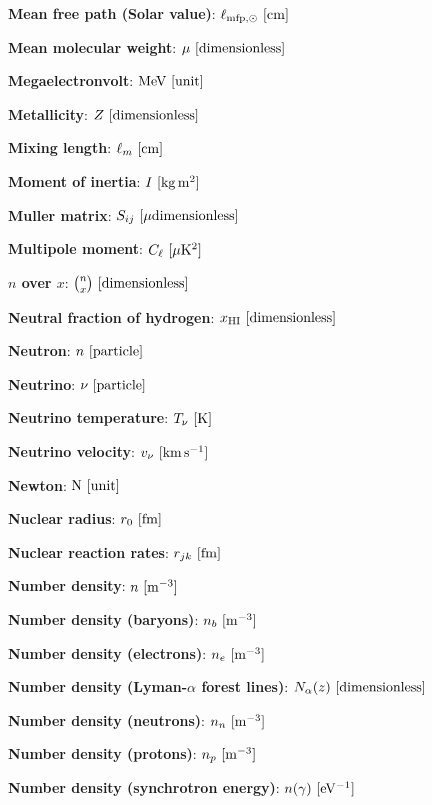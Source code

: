 \documentclass[a4paper,10pt]{article}
\begin{document}
{\noindent}\textbf{Mean free path (Solar value)}: $\ell_{{\rm mfp},\odot} ~ [{\rm cm}]$

{\noindent}\textbf{Mean molecular weight}: $\mu ~ [{\rm dimensionless}]$

{\noindent}\textbf{Megaelectronvolt}: ${\rm MeV} ~ [{\rm unit}]$

{\noindent}\textbf{Metallicity}: $Z ~ [{\rm dimensionless}]$

{\noindent}\textbf{Mixing length}: $\ell_m ~ [{\rm cm}]$

{\noindent}\textbf{Moment of inertia}: $I ~ [{\rm kg\,m^2}]$

{\noindent}\textbf{Muller matrix}: $S_{ij} ~ [{\rm \mu dimensionless}]$

{\noindent}\textbf{Multipole moment}: $C_\ell ~ [{\rm \mu K^2}]$

{\noindent}\textbf{$n$ over $x$}: $\binom{n}{x} ~ [{\rm dimensionless}]$

{\noindent}\textbf{Neutral fraction of hydrogen}: $x_\mathrm{HI} ~ [{\rm dimensionless}]$

{\noindent}\textbf{Neutron}: $n ~ [{\rm particle}]$

{\noindent}\textbf{Neutrino}: $\nu ~ [{\rm particle}]$

{\noindent}\textbf{Neutrino temperature}: $T_\nu ~ [{\rm K}]$

{\noindent}\textbf{Neutrino velocity}: $v_\nu ~ [{\rm km\,s^{-1}}]$

{\noindent}\textbf{Newton}: ${\rm N} ~ [{\rm unit}]$

{\noindent}\textbf{Nuclear radius}: $r_0 ~ [{\rm fm}]$

{\noindent}\textbf{Nuclear reaction rates}: $r_{jk} ~ [{\rm fm}]$

{\noindent}\textbf{Number density}: $n ~ [{\rm m^{-3}}]$

{\noindent}\textbf{Number density (baryons)}: $n_b ~ [{\rm m^{-3}}]$

{\noindent}\textbf{Number density (electrons)}: $n_e ~ [{\rm m^{-3}}]$

{\noindent}\textbf{Number density (Lyman-$\alpha$ forest lines)}: $N_\alpha(z) ~ [{\rm dimensionless}]$

{\noindent}\textbf{Number density (neutrons)}: $n_n ~ [{\rm m^{-3}}]$

{\noindent}\textbf{Number density (protons)}: $n_p ~ [{\rm m^{-3}}]$

{\noindent}\textbf{Number density (synchrotron energy)}: $n(\gamma) ~ [{\rm eV^{-1}}]$
\end{document}
